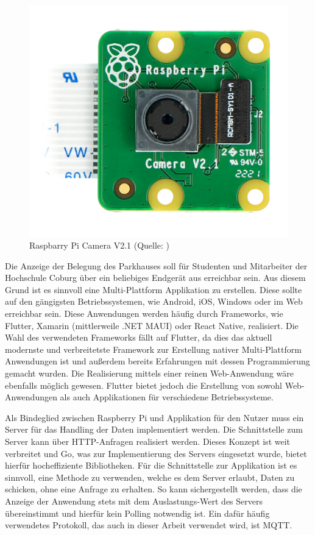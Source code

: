 \begin{figure}[h]
	\myImagePos{}
	\includegraphics[width=0.4\myImageWidth]{Bilder/piCam.jpg}
	\caption[Raspberry Pi Camera V2.1]{Raspbarry Pi Camera V2.1 (Quelle: \cite{PiCamPIC})}
	\label{fig:PiCAM}
\end{figure}

Die Anzeige der Belegung des Parkhauses soll für Studenten und Mitarbeiter der Hochschule Coburg über ein beliebiges Endgerät aus erreichbar sein.
Aus diesem Grund ist es sinnvoll eine Multi-Plattform Applikation zu erstellen.
Diese sollte auf den gängigsten Betriebssystemen, wie Android, iOS, Windows oder im Web erreichbar sein.
Diese Anwendungen werden häufig durch Frameworks, wie Flutter, Xamarin (mittlerweile .NET MAUI) oder React Native, realisiert.
Die Wahl des verwendeten Frameworks fällt auf Flutter, da dies das aktuell modernste und verbreitetste Framework zur Erstellung nativer Multi-Plattform Anwendungen ist und außerdem bereits Erfahrungen mit dessen Programmierung gemacht wurden.
Die Realisierung mittels einer reinen Web-Anwendung wäre ebenfalls möglich gewesen.
Flutter bietet jedoch die Erstellung von sowohl Web-Anwendungen als auch Applikationen für verschiedene Betriebssysteme.

Als Bindeglied zwischen Raspberry Pi und Applikation für den Nutzer muss ein Server für das Handling der Daten implementiert werden.
Die Schnittstelle zum Server kann über HTTP-Anfragen realisiert werden.
Dieses Konzept ist weit verbreitet und Go, was zur Implementierung des Servers eingesetzt wurde, bietet hierfür hocheffiziente Bibliotheken.
Für die Schnittstelle zur Applikation ist es sinnvoll, eine Methode zu verwenden, welche es dem Server erlaubt, Daten zu schicken, ohne eine Anfrage zu erhalten.
So kann sichergestellt werden, dass die Anzeige der Anwendung stets mit dem Auslastungs-Wert des Servers übereinstimmt und hierfür kein Polling notwendig ist.
Ein dafür häufig verwendetes Protokoll, das auch in dieser Arbeit verwendet wird, ist MQTT.\@
